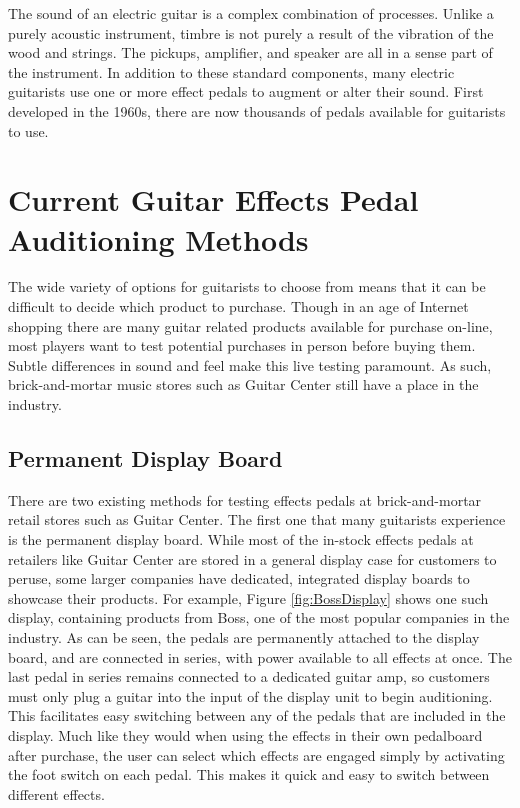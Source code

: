 
The sound of an electric guitar is a complex combination of processes.  Unlike a purely acoustic instrument, timbre is not purely a result of the vibration of the wood and strings.  The pickups, amplifier, and speaker are all in a sense part of the instrument.  In addition to these standard components, many electric guitarists use one or more effect pedals to augment or alter their sound. First developed in the 1960s, there are now thousands of pedals available for guitarists to use.

\section{Current Guitar Effects Pedal Auditioning Methods}

The wide variety of options for guitarists to choose from means that it can be difficult to decide which product to purchase.  Though in an age of Internet shopping there are many guitar related products available for purchase on-line, most players want to test potential purchases in person before buying them.  Subtle differences in sound and feel make this live testing paramount.  As such, brick-and-mortar music stores such as Guitar Center still have a place in the industry.  


\subsection{Permanent Display Board}

There are two existing methods for testing effects pedals at brick-and-mortar retail stores such as Guitar Center.  The first one that many guitarists experience is the permanent display board.  While most of the in-stock effects pedals at retailers like Guitar Center are stored in a general display case for customers to peruse, some larger companies have dedicated, integrated display boards to showcase their products.  For example, Figure \ref{fig:BossDisplay} shows one such display, containing products from Boss, one of the most popular companies in the industry.  As can be seen, the pedals are permanently attached to the display board, and are connected in series, with power available to all effects at once.  The last pedal in series remains connected to a dedicated guitar amp, so customers must only plug a guitar into the input of the display unit to begin auditioning.  This facilitates easy switching between any of the pedals that are included in the display.  Much like they would when using the effects in their own pedalboard after purchase, the user can select which effects are engaged simply by activating the foot switch on each pedal.  This makes it quick and easy to switch between different effects.

